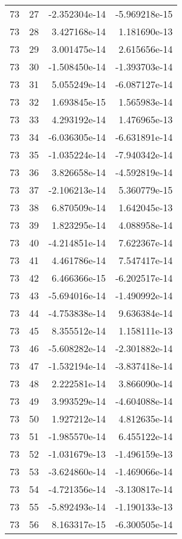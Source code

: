 \begin{tabular}{rrrr}
  73 &   27 & -2.352304e-14 & -5.969218e-15 \\
  73 &   28 &  3.427168e-14 &  1.181690e-13 \\
  73 &   29 &  3.001475e-14 &  2.615656e-14 \\
  73 &   30 & -1.508450e-14 & -1.393703e-14 \\
  73 &   31 &  5.055249e-14 & -6.087127e-14 \\
  73 &   32 &  1.693845e-15 &  1.565983e-14 \\
  73 &   33 &  4.293192e-14 &  1.476965e-13 \\
  73 &   34 & -6.036305e-14 & -6.631891e-14 \\
  73 &   35 & -1.035224e-14 & -7.940342e-14 \\
  73 &   36 &  3.826658e-14 & -4.592819e-14 \\
  73 &   37 & -2.106213e-14 &  5.360779e-15 \\
  73 &   38 &  6.870509e-14 &  1.642045e-13 \\
  73 &   39 &  1.823295e-14 &  4.088958e-14 \\
  73 &   40 & -4.214851e-14 &  7.622367e-14 \\
  73 &   41 &  4.461786e-14 &  7.547417e-14 \\
  73 &   42 &  6.466366e-15 & -6.202517e-14 \\
  73 &   43 & -5.694016e-14 & -1.490992e-14 \\
  73 &   44 & -4.753838e-14 &  9.636384e-14 \\
  73 &   45 &  8.355512e-14 &  1.158111e-13 \\
  73 &   46 & -5.608282e-14 & -2.301882e-14 \\
  73 &   47 & -1.532194e-14 & -3.837418e-14 \\
  73 &   48 &  2.222581e-14 &  3.866090e-14 \\
  73 &   49 &  3.993529e-14 & -4.604088e-14 \\
  73 &   50 &  1.927212e-14 &  4.812635e-14 \\
  73 &   51 & -1.985570e-14 &  6.455122e-14 \\
  73 &   52 & -1.031679e-13 & -1.496159e-13 \\
  73 &   53 & -3.624860e-14 & -1.469066e-14 \\
  73 &   54 & -4.721356e-14 & -3.130817e-14 \\
  73 &   55 & -5.892493e-14 & -1.190133e-13 \\
  73 &   56 &  8.163317e-15 & -6.300505e-14 \\

\end{tabular}
